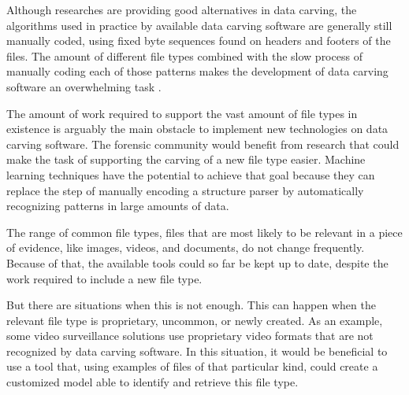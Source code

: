 Although researches are providing good alternatives in data carving, the algorithms used in practice by available data carving software are generally still manually coded, using fixed byte sequences found on headers and footers of the files. The amount of different file types combined with the slow process of manually coding each of those patterns makes the development of data carving software an overwhelming task \cite{mcdaniel_content_2003}. 



The amount of work required to support the vast amount of file types in existence is arguably the main obstacle to implement new technologies on data carving software. The forensic community would benefit from research that could make the task of supporting the carving of a new file type easier. Machine learning techniques have the potential to achieve that goal because they can replace the step of manually encoding a structure parser by automatically recognizing patterns in large amounts of data.

The range of common file types, files that are most likely to be relevant in a piece of evidence, like images, videos, and documents, do not change frequently. Because of that, the available tools could so far be kept up to date, despite the work required to include a new file type.

But there are situations when this is not enough. This can happen when the relevant file type is proprietary, uncommon, or newly created. As an example, some video surveillance solutions use proprietary video formats that are not recognized by data carving software. In this situation, it would be beneficial to use a tool that, using examples of files of that particular kind, could create a customized model able to identify and retrieve this file type.

